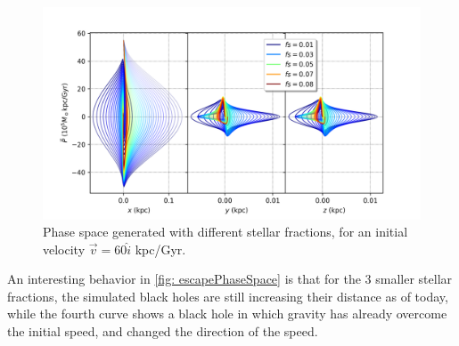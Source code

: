 	\begin{figure}[h]
		\centering
		\includegraphics[width = 0.9\linewidth]{"../Files/Week 9/PhaseSpace_in"}
		\caption{Phase space generated with different stellar fractions, for an initial velocity $\vec{v} = 60\hat{i}$ kpc/Gyr.}
		\label{fig: escapeInner}
	\end{figure}

	An interesting behavior in \autoref{fig: escapePhaseSpace} is that for the 3 smaller stellar fractions, the simulated black holes are still increasing their distance as of today, while the fourth curve shows a black hole in which gravity has already overcome the initial speed, and changed the direction of the speed.
	
